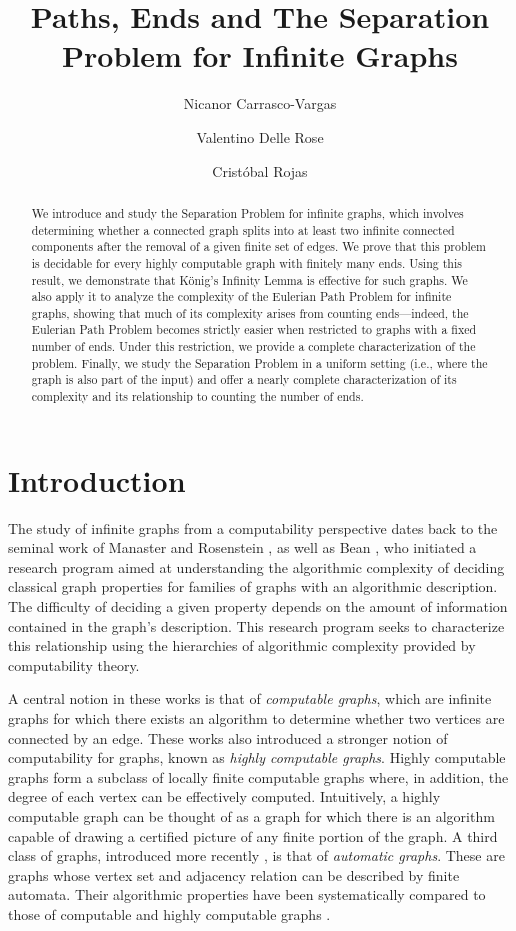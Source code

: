 \documentclass[10pt,A4]{amsart}
\title{Paths, Ends and The Separation Problem for Infinite Graphs}
\author[N. Carrasco-Vargas]{Nicanor Carrasco-Vargas}
\author[V. Delle Rose]{Valentino Delle Rose}
\author[C. Rojas]{Crist\'obal Rojas}
\theoremstyle{definition}
\theoremstyle{definition}
\begin{document}
\begin{abstract}
We introduce and study the Separation Problem for infinite graphs, which involves determining whether a connected graph splits into at least two infinite connected components after the removal of a given finite set of edges. We prove that this problem is decidable for every highly computable graph with finitely many ends. Using this result, we demonstrate that König’s Infinity Lemma is effective for such graphs. We also apply it to analyze the complexity of the Eulerian Path Problem for infinite graphs, showing that much of its complexity arises from counting ends—indeed, the Eulerian Path Problem becomes strictly easier when restricted to graphs with a fixed number of ends. Under this restriction, we provide a complete characterization of the problem. Finally, we study the Separation Problem in a uniform setting (i.e., where the graph is also part of the input) and offer a nearly complete characterization of its complexity and its relationship to counting the number of ends.
\end{abstract}
\maketitle

\section{Introduction}
The study of infinite graphs from a computability perspective dates back to the seminal work of Manaster and Rosenstein \cite{Manaster-Rosenstein}, as well as Bean \cite{Bean-color, Bean-paths}, who initiated a research program aimed at understanding the algorithmic complexity of deciding classical graph properties for families of graphs with an algorithmic description. The difficulty of deciding a given property depends on the amount of information contained in the graph's description. This research program seeks to characterize this relationship using the hierarchies of algorithmic complexity provided by computability theory.



A central notion in these works is that of \emph{computable graphs}, which are infinite graphs for which there exists an algorithm to determine whether two vertices are connected by an edge. These works also introduced a stronger notion of computability for graphs, known as \emph{highly computable graphs}. Highly computable graphs form a subclass of locally finite computable graphs where, in addition, the degree of each vertex can be effectively computed. Intuitively, a highly computable graph can be thought of as a graph for which there is an algorithm capable of drawing a certified picture of any finite portion of the graph. A third class of graphs, introduced more recently \cite{khoussainov_automatic_1995}, is that of \emph{automatic graphs}. These are graphs whose vertex set and adjacency relation can be described by finite automata. Their algorithmic properties have been systematically compared to those of computable and highly computable graphs \cite{gradel_automatic_2020}.
\end{document}
